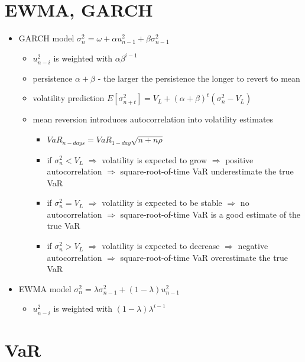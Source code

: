 \section{EWMA, GARCH}

\begin{itemize}
\item GARCH model $\sigma_n^2 = \omega + \alpha u_{n-1}^2 + \beta \sigma_{n-1}^2$
\begin{itemize}
\item $u_{n-i}^2$ is weighted with $\alpha \beta^{i-1}$
\item persistence $\alpha + \beta$ - the larger the persistence the longer to revert to mean
\item volatility prediction $E[\sigma_{n+t}^2] = V_L + (\alpha + \beta)^t(\sigma_n^2 - V_L)$
\item mean reversion introduces autocorrelation into volatility estimates
\begin{itemize}
\item $VaR_{n-days} = VaR_{1-day}\sqrt{n + n\rho}$
\item if $\sigma_n^2 < V_L$ $\Rightarrow$ volatility is expected to grow $\Rightarrow$ positive autocorrelation $\Rightarrow$ square-root-of-time VaR underestimate the true VaR
\item if $\sigma_n^2 = V_L$ $\Rightarrow$ volatility is expected to be stable $\Rightarrow$ no autocorrelation $\Rightarrow$ square-root-of-time VaR is a good estimate of the true VaR
\item if $\sigma_n^2 > V_L$ $\Rightarrow$ volatility is expected to decrease $\Rightarrow$ negative autocorrelation $\Rightarrow$ square-root-of-time VaR overestimate the true VaR
\end{itemize}
\end{itemize}
\item EWMA model $\sigma_n^2 = \lambda \sigma_{n-1}^2 + (1-\lambda)u_{n-1}^2$
\begin{itemize}
\item $u_{n-i}^2$ is weighted with $(1-\lambda) \lambda^{i-1}$
\end{itemize}
\end{itemize}

\section{VaR}

